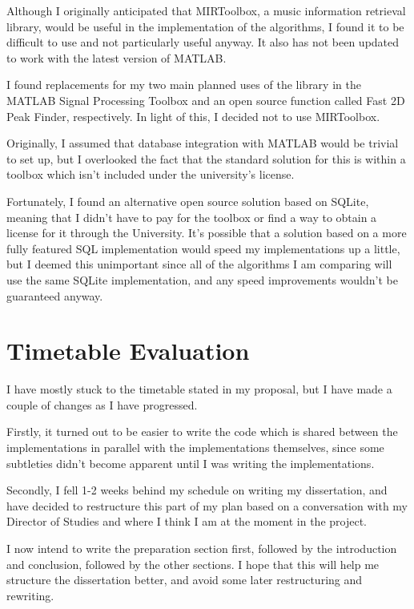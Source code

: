 \documentclass[12pt]{article}
\begin{document}
Although I originally anticipated that MIRToolbox, a music information retrieval library, would be useful in the implementation of the algorithms, I found it to be difficult to use and not particularly useful anyway. It also has not been updated to work with the latest version of MATLAB. 

I found replacements for my two main planned uses of the library in the MATLAB Signal Processing Toolbox and an open source function called Fast 2D Peak Finder, respectively. In light of this, I decided not to use MIRToolbox.

Originally, I assumed that database integration with MATLAB would be trivial to set up, but I overlooked the fact that the standard solution for this is within a toolbox which isn't included under the university's license. 

Fortunately, I found an alternative open source solution based on SQLite, meaning that I didn't have to pay for the toolbox or find a way to obtain a license for it through the University. It's possible that a solution based on a more fully featured SQL implementation would speed my implementations up a little, but I deemed this unimportant since all of the algorithms I am comparing will use the same SQLite implementation, and any speed improvements wouldn't be guaranteed anyway.

\section*{Timetable Evaluation}

I have mostly stuck to the timetable stated in my proposal, but I have made a couple of changes as I have progressed.

Firstly, it turned out to be easier to write the code which is shared between the implementations in parallel with the implementations themselves, since some subtleties didn't become apparent until I was writing the implementations. 

Secondly, I fell 1-2 weeks behind my schedule on writing my dissertation, and have decided to restructure this part of my plan based on a conversation with my Director of Studies and where I think I am at the moment in the project.

I now intend to write the preparation section first, followed by the introduction and conclusion, followed by the other sections. I hope that this will help me structure the dissertation better, and avoid some later restructuring and rewriting. 
\end{document}
